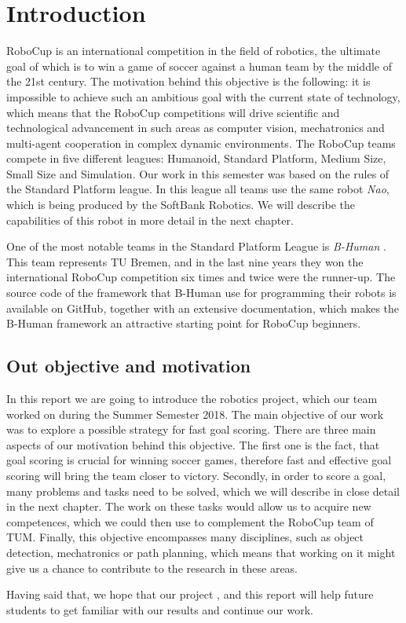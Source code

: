 \chapter{Introduction}

RoboCup \cite{robocup} is an international competition in the field of
robotics, the ultimate goal of which is to win a game of soccer against a human
team by the middle of the 21st century. The motivation behind this objective is
the following: it is impossible to achieve such an ambitious goal with the
current state of technology, which means that the RoboCup competitions will
drive scientific and technological advancement in such areas as computer
vision, mechatronics and multi-agent cooperation in complex dynamic
environments. The RoboCup teams compete in five different leagues: Humanoid,
Standard Platform, Medium Size, Small Size and Simulation. Our work in this
semester was based on the rules of the Standard Platform league. In this league
all teams use the same robot \textit{Nao}, which is being produced by the
SoftBank Robotics. We will describe the capabilities of this robot in more
detail in the next chapter.

One of the most notable teams in the Standard Platform League is
\textit{B-Human} \cite{bhuman}. This team represents TU Bremen, and in the last
nine years they won the international RoboCup competition six times and twice
were the runner-up. The source code of the framework that B-Human use for
programming their robots is available on GitHub, together with an extensive
documentation, which makes the B-Human framework an attractive starting point
for RoboCup beginners.

\section{Out objective and motivation}
\label{sec problem statement}

In this report we are going to introduce the robotics project, which our team
worked on during the Summer Semester 2018. The main objective of our work was
to explore a possible strategy for fast goal scoring. There are three main
aspects of our motivation behind this objective. The first one is the fact,
that goal scoring is crucial for winning soccer games, therefore fast and
effective goal scoring will bring the team closer to victory. Secondly, in
order to score a goal, many problems and tasks need to be solved, which we will
describe in close detail in the next chapter. The work on these tasks would
allow us to acquire new competences, which we could then use to complement the
RoboCup team of TUM. Finally, this objective encompasses many disciplines, such
as object detection, mechatronics or path planning, which means that working on
it might give us a chance to contribute to the research in these areas.

Having said that, we hope that our project , and this report
will help future students to get familiar with our results and continue our
work.
